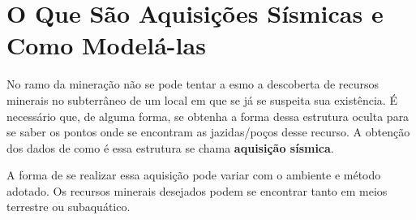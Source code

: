 \section{O Que São Aquisições Sísmicas e Como Modelá-las}

	No ramo da mineração não se pode tentar a esmo a descoberta de recursos
	minerais no subterrâneo de um local em que se já se suspeita sua existência.
	É necessário que, de alguma forma, se obtenha a forma dessa estrutura oculta
	para se saber os pontos onde se encontram as jazidas/poços desse recurso.
	A obtenção dos dados de como é essa estrutura se chama \textbf{aquisição
	sísmica}.

	A forma de se realizar essa aquisição pode variar com o ambiente e método
	adotado. Os recursos minerais desejados podem se encontrar tanto em meios
	terrestre ou subaquático.
